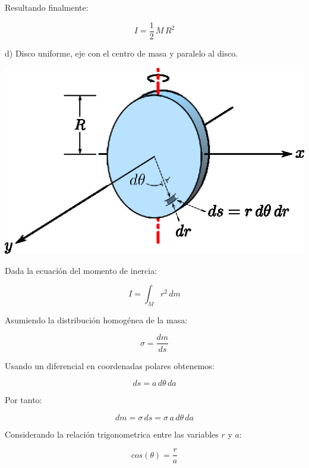 \documentclass[letter,11pt]{article}
\begin{document}
Resultando finalmente:

\begin{equation}
    I = \frac{1}{2}\, M\, R^2
\end{equation}

\newpage
d) Disco uniforme, eje con el centro de masa y paralelo al disco.

\begin{center}
\includegraphics[scale=1.25]{resources/f4.eps}
\end{center}

Dada la ecuación del momento de inercia:

\begin{equation}
    I = \int_{M} r^2\, dm
\label{momentodeinercia4}
\end{equation}

Asumiendo la distribución homogénea de la masa:

\begin{equation*}
    \sigma = \frac{dm}{ds}
\end{equation*}

Usando un diferencial en coordenadas polares obtenemos:

\begin{equation*}
    ds = a\, d\theta\, da
\end{equation*}

Por tanto:

\begin{equation}
    dm = \sigma\, ds = \sigma\, a\, d\theta\, da
\label{dm4}
\end{equation}

Considerando la relación trigonometrica entre las variables $r$ y $a$:

\begin{equation*}
    cos (\theta) = \frac{r}{a}
\end{equation*}
\end{document}
